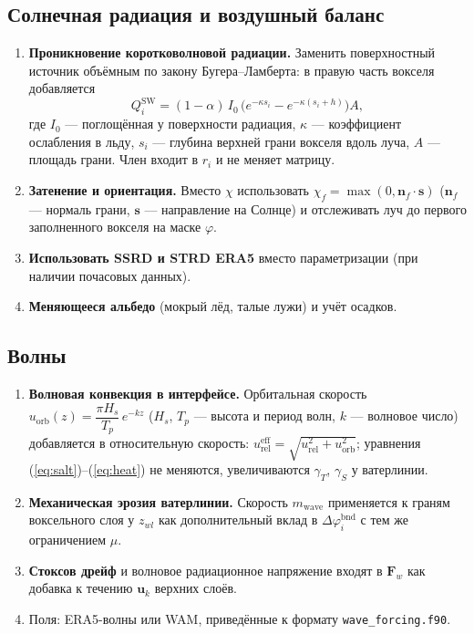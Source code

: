\documentclass[12pt,a4paper]{article}
\newcommand{\code}[1]{\texttt{\small #1}}
\begin{document}
\subsection{Солнечная радиация и воздушный баланс}
\begin{enumerate}
\item \textbf{Проникновение коротковолновой радиации.} Заменить поверхностный источник объёмным по закону Бугера--Ламберта: в правую часть вокселя добавляется
\[
Q_{i}^{\mathrm{SW}}=(1-\alpha)\,I_0\,\bigl(e^{-\kappa s_i}-e^{-\kappa (s_i+h)}\bigr)A,
\]
где $I_0$ --- поглощённая у поверхности радиация, $\kappa$ --- коэффициент ослабления в льду, $s_i$ --- глубина верхней грани вокселя вдоль луча, $A$ --- площадь грани. Член входит в $r_i$ и не меняет матрицу.
\item \textbf{Затенение и ориентация.} Вместо $\chi$ использовать $\chi_f=\max(0,\mathbf n_f\!\cdot\mathbf s)$ ($\mathbf n_f$ --- нормаль грани, $\mathbf s$ --- направление на Солнце) и отслеживать луч до первого заполненного вокселя на маске $\varphi$.
\item \textbf{Использовать SSRD и STRD ERA5} вместо параметризации (при наличии почасовых данных).
\item \textbf{Меняющееся альбедо} (мокрый лёд, талые лужи) и учёт осадков.
\end{enumerate}

\subsection{Волны}
\begin{enumerate}
\item \textbf{Волновая конвекция в интерфейсе.} Орбитальная скорость $u_{\mathrm{orb}}(z)=\dfrac{\pi H_s}{T_p}\,e^{-kz}$ ($H_s$, $T_p$ --- высота и период волн, $k$ --- волновое число) добавляется в относительную скорость: $u_{\mathrm{rel}}^{\mathrm{eff}}=\sqrt{u_{\mathrm{rel}}^2+u_{\mathrm{orb}}^2}$; уравнения (\ref{eq:salt})--(\ref{eq:heat}) не меняются, увеличиваются $\gamma_T$, $\gamma_S$ у ватерлинии.
\item \textbf{Механическая эрозия ватерлинии.} Скорость $m_{\mathrm{wave}}$ применяется к граням воксельного слоя у $z_{wl}$ как дополнительный вклад в $\Delta\varphi_i^{\mathrm{bnd}}$ с тем же ограничением $\mu$.
\item \textbf{Стоксов дрейф} и волновое радиационное напряжение входят в $\mathbf F_w$ как добавка к течению $\mathbf u_k$ верхних слоёв.
\item Поля: ERA5-волны или WAM, приведённые к формату \code{wave\_forcing.f90}.
\end{enumerate}
\end{document}
